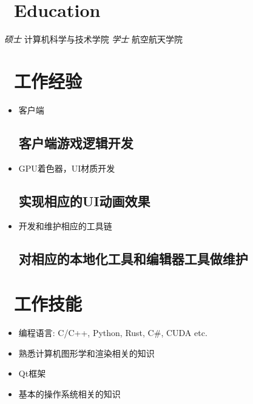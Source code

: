 \documentclass{resume}
\begin{document}



\section{\faGraduationCap\ Education}
\textit{硕士} 计算机科学与技术学院
\textit{学士} 航空航天学院

\section{\faUsers\ 工作经验}
\begin{itemize}
  \item 客户端
  \subsection{客户端游戏逻辑开发}

  \item GPU着色器，UI材质开发
  \subsection{实现相应的UI动画效果}

  \item 开发和维护相应的工具链
  \subsection{对相应的本地化工具和编辑器工具做维护}

\end{itemize}

\section{\faCogs\ 工作技能}
\begin{itemize}[parsep=0.5ex]
  \item 编程语言: C/C++, Python, Rust, C\#, CUDA etc.
  \item 熟悉计算机图形学和渲染相关的知识
  \item Qt框架
  \item 基本的操作系统相关的知识
\end{itemize}
\end{document}

